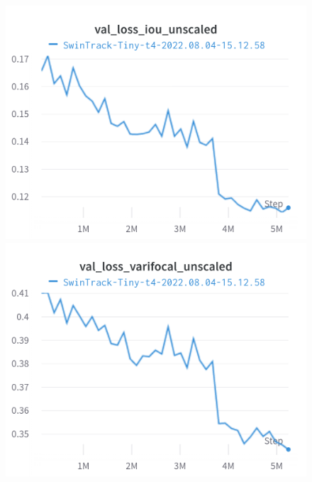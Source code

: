 \documentclass{article}
\begin{document}
\begin{figure}[h]
\includegraphics[width=\linewidth]{charts/Section-2-Panel-4-ei56nbqyw}
\caption{}
\endminipage\hfill
{}
\includegraphics[width=\linewidth]{charts/Section-2-Panel-5-tc79yxx9w}
\caption{}
\endminipage
\end{figure}
\end{document}
